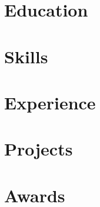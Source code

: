 \documentclass[a4paper,11pt]{article}
\begin{document}
\newcommand{\resumeRole}{AI Engineer}
\newcommand{\resumeJobTitleGulzar}{Python Developer}



\section{Education}


\vspace{-15pt}
\section{Skills}


\section{Experience}
\resumeSubHeadingListStart
  
  
  
  
  
  
\resumeSubHeadingListEnd

\section{Projects}
\resumeSubHeadingListStart
  
  
\resumeSubHeadingListEnd

\section{Awards}

\end{document}
